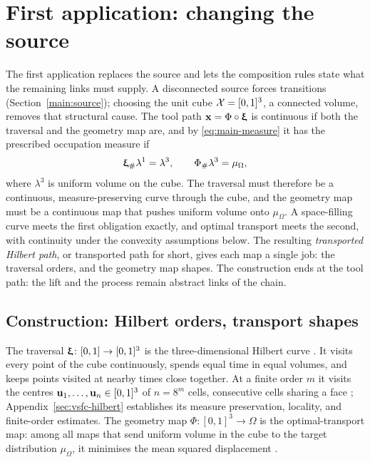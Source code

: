 \section{First application: changing the source}
\label{main:construction}

The first application replaces the source and lets the composition rules state what the remaining links must supply. A disconnected source forces transitions (Section~\ref{main:source}); choosing the unit cube $\mathcal{X}=[0,1]^3$, a connected volume, removes that structural cause. The tool path ${\bm{\mathrm{x}}}=\Phi\circ{\bm{\mathrm{\upxi}}}$ is continuous if both the traversal and the geometry map are, and by \eqref{eq:main-measure} it has the prescribed occupation measure if
\begin{equation}
  \label{eq:main-volume-obligations}
  {\bm{\mathrm{\upxi}}}_\#\lambda^1=\lambda^3,\qquad \Phi_\#\lambda^3=\mu_\Omega ,
\end{equation}
where $\lambda^3$ is uniform volume on the cube. The traversal must therefore be a continuous, measure-preserving curve through the cube, and the geometry map must be a continuous map that pushes uniform volume onto $\mu_\Omega$. A space-filling curve meets the first obligation exactly, and optimal transport meets the second, with continuity under the convexity assumptions below. The resulting \emph{transported Hilbert path}, or transported path for short, gives each map a single job: the traversal orders, and the geometry map shapes. The construction ends at the tool path: the lift and the process remain abstract links of the chain.

\subsection{Construction: Hilbert orders, transport shapes}
The traversal ${\bm{\mathrm{\upxi}}}\colon[0,1]\to[0,1]^3$ is the three-dimensional Hilbert curve \cite{hilbert1891,sagan1994,bader2013}. It visits every point of the cube continuously, spends equal time in equal volumes, and keeps points visited at nearby times close together. At a finite order $m$ it visits the centres ${\bm{\mathrm{u}}}_1,\dots,{\bm{\mathrm{u}}}_n\in[0,1]^3$ of $n=8^m$ cells, consecutive cells sharing a face \cite{haverkort2017}; Appendix~\ref{sec:vsfc-hilbert} establishes its measure preservation, locality, and finite-order estimates. The geometry map $\Phi\colon[0,1]^3\to\Omega$ is the optimal-transport map: among all maps that send uniform volume in the cube to the target distribution $\mu_\Omega$, it minimises the mean squared displacement \cite{brenier1991,peyre2019computational}.

